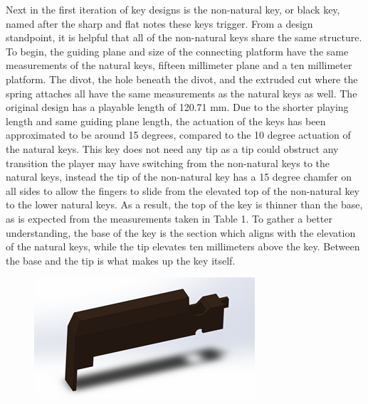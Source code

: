 Next in the first iteration of key designs is the non-natural key, or black key, named after the sharp and flat notes these keys trigger. From a design standpoint, it is helpful that all of the non-natural keys share the same structure. To begin, the guiding plane and size of the connecting platform have the same measurements of the natural keys, fifteen millimeter plane and a ten millimeter platform. The divot, the hole beneath the divot, and the extruded cut where the spring attaches all have the same measurements as the natural keys as well. The original design has a playable length of 120.71 mm. Due to the shorter playing length and same guiding plane length, the actuation of the keys has been approximated to be around 15 degrees, compared to the 10 degree actuation of the natural keys. This key does not need any tip as a tip could obstruct any transition the player may have switching from the non-natural keys to the natural keys, instead the tip of the non-natural key has a 15 degree chamfer on all sides to allow the fingers to slide from the elevated top of the non-natural key to the lower natural keys. As a result, the top of the key is thinner than the base, as is expected from the measurements taken in Table 1. To gather a better understanding, the base of the key is the section which aligns with the elevation of the natural keys, while the tip elevates ten millimeters above the key. Between the base and the tip is what makes up the key itself.

\begin{figure}[h!]
  \centering
  \includegraphics[width=0.7\linewidth]{image/BlackModel.png}
  \caption{}
  \label{fig:black_model}
\end{figure}

